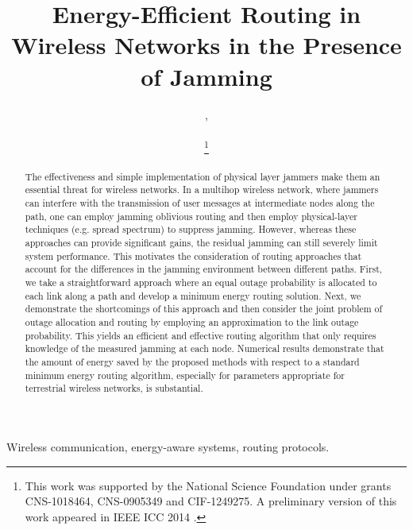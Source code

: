 \documentclass[10pt,journal]{IEEEtran}
\theoremstyle{definition}
\begin{document}
\title{Energy-Efficient Routing in Wireless Networks in the Presence of Jamming}
\author{
    ,\\
    \\
    \thanks{This work was supported by the National Science Foundation under grants
   CNS-1018464, CNS-0905349 and CIF-1249275. A preliminary version of this work appeared in IEEE ICC 2014 \cite{icc2014}.}
}
\date{}
\maketitle
\begin{abstract}


The effectiveness and simple implementation of physical layer jammers make them an essential threat for wireless networks. In a multihop wireless network, where jammers can interfere with the transmission of user messages at  intermediate nodes along the path, one can employ jamming oblivious routing and then employ physical-layer techniques (e.g. spread spectrum) to suppress jamming. 
However, whereas these approaches can provide significant gains, the residual jamming can still severely limit system performance. 
This motivates the consideration of routing approaches that account for the differences in the jamming environment between different paths.  
First, we take a straightforward approach where an equal outage probability is allocated to each link along a path and develop a minimum energy routing solution. 
Next, we demonstrate the shortcomings of this approach and then consider the joint problem of  outage allocation and routing by employing an approximation to the link outage probability.  This yields an efficient and effective routing algorithm that only requires knowledge of the measured jamming at each node. 
Numerical results demonstrate  that the amount of energy saved by the proposed methods with respect to a standard minimum energy routing algorithm, especially for parameters appropriate for terrestrial wireless networks, is substantial.
\end{abstract}
\begin{IEEEkeywords}
Wireless communication, energy-aware systems, routing protocols.
\end{IEEEkeywords}
\end{document}
